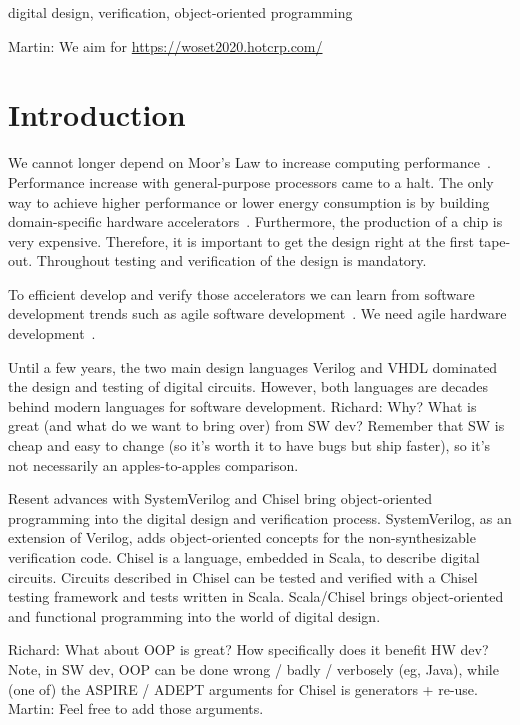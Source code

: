 \documentclass[conference]{IEEEtran}
\newcommand{\martin}[1]{{\color{blue} Martin: #1}}
\newcommand{\ducky}[1]{{\color{orange} Richard: #1}}
\begin{document}
\begin{IEEEkeywords}
digital design, verification, object-oriented programming
\end{IEEEkeywords}

\martin{We aim for \url{https://woset2020.hotcrp.com/}}

\section{Introduction}
\label{sec:intro}


We cannot longer depend on Moor's Law to increase computing performance~\cite{dark-silicon:2011}.
Performance increase with general-purpose processors came to a halt.
The only way to achieve higher performance or lower energy consumption
is by building domain-specific hardware accelerators~\cite{domain-hw-acc:2020}.
Furthermore, the production of a chip is very expensive. Therefore, it is important to get the design right
at the first tape-out. Throughout testing and verification of the design is mandatory.

To efficient develop and verify those accelerators we can learn from software development trends
such as agile software development~\cite{agile:manifesto}.
We need agile hardware development~\cite{henn-patt:turing:2019}.

Until a few years, the two main design languages Verilog and VHDL dominated the
design and testing of digital circuits. However, both languages are decades behind
modern languages for software development. \ducky{Why? What is great (and what do we want to bring over) from SW dev? Remember that SW is cheap and easy to change (so it's worth it to have bugs but ship faster), so it's not necessarily an apples-to-apples comparison.}

Resent advances with SystemVerilog and Chisel bring object-oriented programming
into the digital design and verification process. SystemVerilog, as an extension of Verilog,
adds object-oriented concepts for the non-synthesizable verification code.
Chisel is a language, embedded in Scala, to describe digital circuits.
Circuits described in Chisel can be tested and verified with a Chisel testing
framework and tests written in Scala.
Scala/Chisel brings object-oriented and functional programming into the world of
digital design.

\ducky{What about OOP is great? How specifically does it benefit HW dev? Note, in SW dev, OOP can be done wrong / badly / verbosely (eg, Java), while (one of) the ASPIRE / ADEPT arguments for Chisel is generators + re-use.}
\martin{Feel free to add those arguments.}
\end{document}
